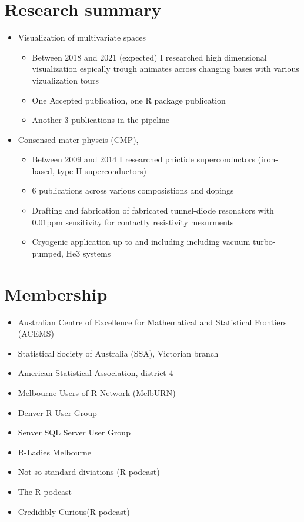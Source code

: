 \documentclass[10pt,a4paper,]{article}
\providecommand{\tightlist}{%
  \setlength{\itemsep}{0pt}\setlength{\parskip}{0pt}}
\begin{document}
\hypertarget{research-summary}{%
\section{Research summary}\label{research-summary}}

\begin{itemize}
\tightlist
\item
  Visualization of multivariate spaces

  \begin{itemize}
  \tightlist
  \item
    Between 2018 and 2021 (expected) I researched high dimensional visualization espically trough animates across changing bases with various vizualization tours
  \item
    One Accepted publication, one R package publication
  \item
    Another 3 publications in the pipeline
  \end{itemize}
\item
  Consensed mater physcis (CMP),

  \begin{itemize}
  \tightlist
  \item
    Between 2009 and 2014 I researched pnictide superconductors (iron-based, type II superconductors)
  \item
    6 publications across various composistions and dopings
  \item
    Drafting and fabrication of fabricated tunnel-diode resonators with 0.01ppm sensitivity for contactly resistivity mesurments
  \item
    Cryogenic application up to and including including vacuum turbo-pumped, He3 systems
  \end{itemize}
\end{itemize}

\hypertarget{membership}{%
\section{Membership}\label{membership}}

\begin{itemize}
\tightlist
\item
  Australian Centre of Excellence for Mathematical and Statistical Frontiers (ACEMS)
\item
  Statistical Society of Australia (SSA), Victorian branch
\item
  American Statistical Association, district 4
\item
  Melbourne Users of R Network (MelbURN)
\item
  Denver R User Group
\item
  Senver SQL Server User Group
\item
  R-Ladies Melbourne
\item
  Not so standard diviations (R podcast)
\item
  The R-podcast
\item
  Credidibly Curious(R podcast)
\end{itemize}
\end{document}
